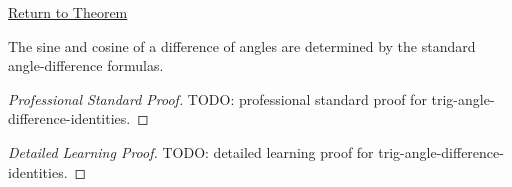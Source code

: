 \newpage
{}
\label{prf:trig-angle-difference-identities}

\begin{remark*}[Return]
\hyperref[thm:trig-angle-difference-identities]{Return to Theorem}
\end{remark*}

\begin{theorem*}
The sine and cosine of a difference of angles are determined by the standard
angle-difference formulas.
\end{theorem*}

\begin{proof}[Professional Standard Proof]
\LRAProofBodyStart
TODO: professional standard proof for trig-angle-difference-identities.
\end{proof}

\begin{proof}[Detailed Learning Proof]
\LRAProofBodyStart
TODO: detailed learning proof for trig-angle-difference-identities.
\end{proof}

\clearpage
